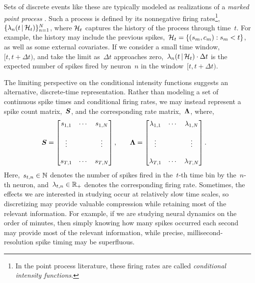 Sets of discrete events like these are typically modeled as realizations
of a \emph{marked point process} \citep{daley2003introduction1}. Such a
process is defined by its nonnegative firing rates\footnote{In the
  point process literature, these firing rates are called
  \emph{conditional intensity functions}.},
${\{\lambda_n(t \,|\, \mathcal{H}_t)\}_{n=1}^N}$, where $\mathcal{H}_t$ captures
the history of the process through time~$t$. For example, the history
may include the previous spikes,~${\mathcal{H}_t = \{(s_m, c_m): s_m < t\}}$,
as well as some external covariates.  If we consider a small time
window,~${[t, t+\Delta t)}$, and take the limit as~$\Delta t$
approaches zero,~${\lambda_n(t \,|\, \mathcal{H}_t) \cdot \Delta t}$ is the
expected number of spikes fired by neuron~$n$ in the
window~${[t, t+\Delta t)}$.  

The limiting perspective on the conditional intensity functions
suggests an alternative, discrete-time representation.  Rather than
modeling a set of continuous spike times and conditional firing rates,
we may instead represent a spike count matrix,~$\boldsymbol{S}$, and the
corresponding rate matrix,~$\boldsymbol{\Lambda}$, where,
\begin{align*}
  \boldsymbol{S} &= 
        \begin{bmatrix}
          s_{1,1} & \cdots & s_{1,N} \\
          & & \\
          \vdots  &        & \vdots  \\ 
          & & \\
          s_{T,1} & \cdots & s_{T,N}
        \end{bmatrix}, 
  & & &
  \boldsymbol{\Lambda} &= 
        \begin{bmatrix}
          \lambda_{1,1} & \cdots & \lambda_{1,N} \\
          & & \\
          \vdots  &        & \vdots  \\ 
          & & \\
          \lambda_{T,1} & \cdots & \lambda_{T,N}
        \end{bmatrix}.
\end{align*}
Here,~${s_{t,n} \in \mathbb{N}}$ denotes the number of spikes fired in
the~$t$-th time bin by the~$n$-th neuron, and~${\lambda_{t,n} \in \mathbb{R}_+}$ denotes 
the corresponding firing rate. Sometimes, the effects we
are interested in studying occur at relatively slow time scales, so
discretizing may provide valuable compression while retaining most of
the relevant information. For example, if we are studying neural
dynamics on the order of minutes, then simply knowing how many spikes
occurred each second may provide most of the relevant information, while
precise, millisecond-resolution spike timing may be superfluous.

